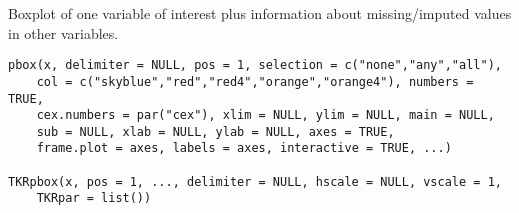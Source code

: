 %
\begin{Description}\relax
Boxplot of one variable of interest plus information about missing/imputed values 
in other variables.
\end{Description}
%
\begin{Usage}
\begin{verbatim}
pbox(x, delimiter = NULL, pos = 1, selection = c("none","any","all"),
    col = c("skyblue","red","red4","orange","orange4"), numbers = TRUE, 
    cex.numbers = par("cex"), xlim = NULL, ylim = NULL, main = NULL,
    sub = NULL, xlab = NULL, ylab = NULL, axes = TRUE,
    frame.plot = axes, labels = axes, interactive = TRUE, ...)

TKRpbox(x, pos = 1, ..., delimiter = NULL, hscale = NULL, vscale = 1,
    TKRpar = list())
\end{verbatim}
\end{Usage}
%
